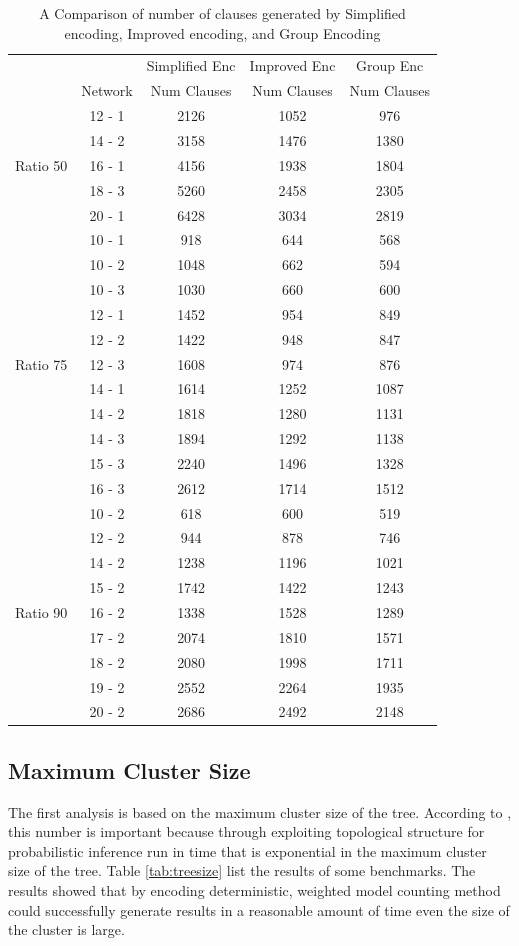 \begin{table}[]
    \centering
    \begin{tabular}{c c c c c}
    \hline
    &	    			&	Simplified Enc	&	Improved Enc	&	Group Enc	\\
    &	Network			&	Num Clauses	&	Num Clauses	&	Num Clauses	\\
    \hline
    \hline
	&	12	-	1	&	2126	&	1052	&	976	\\
	&	14	-	2	&	3158	&	1476	&	1380	\\
Ratio 50	&	16	-	1	&	4156	&	1938	&	1804	\\
	&	18	-	3	&	5260	&	2458	&	2305	\\
	&	20	-	1	&	6428	&	3034	&	2819	\\
	\hline
	&	10	-	1	&	918	&	644	&	568	\\
	&	10	-	2	&	1048	&	662	&	594	\\
	&	10	-	3	&	1030	&	660	&	600	\\
	&	12	-	1	&	1452	&	954	&	849	\\
	&	12	-	2	&	1422	&	948	&	847	\\
Ratio 75	&	12	-	3	&	1608	&	974	&	876	\\
	&	14	-	1	&	1614	&	1252	&	1087	\\
	&	14	-	2	&	1818	&	1280	&	1131	\\
	&	14	-	3	&	1894	&	1292	&	1138	\\
	&	15	-	3	&	2240	&	1496	&	1328	\\
	&	16	-	3	&	2612	&	1714	&	1512	\\
	\hline
	&	10	-	2	&	618	&	600	&	519	\\
	&	12	-	2	&	944	&	878	&	746	\\
	&	14	-	2	&	1238	&	1196	&	1021	\\
	&	15	-	2	&	1742	&	1422	&	1243	\\
Ratio 90	&	16	-	2	&	1338	&	1528	&	1289	\\
	&	17	-	2	&	2074	&	1810	&	1571	\\
	&	18	-	2	&	2080	&	1998	&	1711	\\
	&	19	-	2	&	2552	&	2264	&	1935	\\
	&	20	-	2	&	2686	&	2492	&	2148	\\
	\hline
	\hline
    \end{tabular}
    \caption{A Comparison of number of clauses generated by Simplified encoding, Improved encoding, and Group Encoding}
    \label{tab:comparing the clauses}
\end{table}

\subsection{Maximum Cluster Size}
The first analysis is based on the maximum cluster size of the tree. According to \cite{2008-literature-review}, this number is important because through exploiting topological structure for probabilistic inference run in time that is exponential in the maximum cluster size of the tree. Table \ref{tab:treesize} list the results of some benchmarks. The results showed that by encoding deterministic, weighted model counting method could successfully generate results in a reasonable amount of time even the size of the cluster is large. \\

